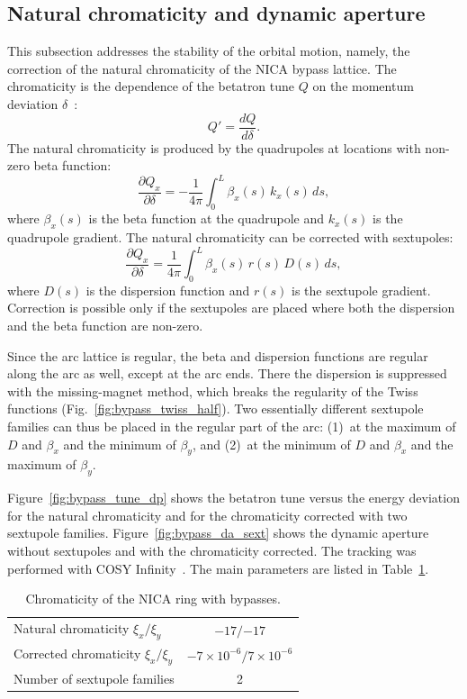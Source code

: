 \subsection{Natural chromaticity and dynamic aperture}

This subsection addresses the stability of the orbital motion, namely, the
correction of the natural chromaticity of the NICA bypass lattice. The
chromaticity is the dependence of the betatron tune $Q$ on the momentum
deviation $\delta$~\cite{Guiducci:1992kb}:
\begin{equation}
  Q' = \frac{dQ}{d\delta} .
\end{equation}
The natural chromaticity is produced by the quadrupoles at locations with
non-zero beta function:
\begin{equation}
  \frac{\partial Q_x}{\partial\delta} = -\frac{1}{4\pi}\int_0^L \beta_x(s)\,k_x(s)\,ds,
\end{equation}
where $\beta_x(s)$ is the beta function at the quadrupole and $k_x(s)$ is the
quadrupole gradient. The natural chromaticity can be corrected with
sextupoles:
\begin{equation}
  \frac{\partial Q_x}{\partial\delta} = \frac{1}{4\pi}\int_0^L \beta_x(s)\,r(s)\,D(s)\,ds,
\end{equation}
where $D(s)$ is the dispersion function and $r(s)$ is the sextupole gradient.
Correction is possible only if the sextupoles are placed where both the
dispersion and the beta function are non-zero.

Since the arc lattice is regular, the beta and dispersion functions are
regular along the arc as well, except at the arc ends. There the dispersion is
suppressed with the missing-magnet method, which breaks the regularity of the
Twiss functions (Fig.~\ref{fig:bypass_twiss_half}). Two essentially different
sextupole families can thus be placed in the regular part of the arc:
(1)~at the maximum of $D$ and $\beta_x$ and the minimum of $\beta_y$, and
(2)~at the minimum of $D$ and $\beta_x$ and the maximum of $\beta_y$.

Figure~\ref{fig:bypass_tune_dp} shows the betatron tune versus the energy
deviation for the natural chromaticity and for the chromaticity corrected with
two sextupole families. Figure~\ref{fig:bypass_da_sext} shows the dynamic
aperture without sextupoles and with the chromaticity corrected. The tracking
was performed with COSY Infinity~\cite{Makino:2006sx}. The main parameters are
listed in Table~\ref{tab:bypass_chrom}.

\begin{table}[htbp]
  \centering
  \caption{Chromaticity of the NICA ring with bypasses.}
  \label{tab:bypass_chrom}
  \begin{tabular}{lc}
    \toprule
    Natural chromaticity $\xi_x/\xi_y$ & $-17/{-17}$ \\
    Corrected chromaticity $\xi_x/\xi_y$ & $-7\times10^{-6}/7\times10^{-6}$ \\
    Number of sextupole families & 2 \\
    \bottomrule
  \end{tabular}
\end{table}

